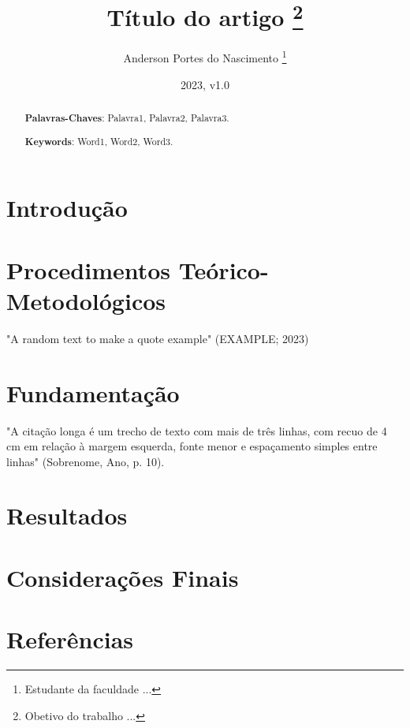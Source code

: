 \documentclass[12pt,a4paper]{article}
\newenvironment{long-quote}{\begin{quotation}\singlespacing\small\noindent}{\end{quotation}}
\begin{document}
    \frenchspacing

    \title{
        Título do artigo \footnote{Obetivo do trabalho ...}
    }
    \author{
        Anderson Portes do Nascimento \footnote{Estudante da faculdade ...}
    }
    \date{2023, v1.0}
    \maketitle

    \begin{abstract}
        \lipsum[1]

        \bigskip

        \noindent\textbf{Palavras-Chaves}: Palavra1, Palavra2, Palavra3.
    \end{abstract}

    \begin{otherlanguage}{english}
        \begin{abstract}
            \lipsum[1]

            \bigskip

            \noindent\textbf{Keywords}: Word1, Word2, Word3.
        \end{abstract}
    \end{otherlanguage}
    
    \section{Introdução}
        \lipsum[1]

        \lipsum[1]
    \section{Procedimentos Teórico-Metodológicos}
        "A random text to make a quote example" (EXAMPLE; 2023)
    \section{Fundamentação}
        \lipsum[1]
        
        \begin{long-quote}
            "A citação longa é um trecho de texto com mais de três linhas, com recuo de 4 cm em relação à margem esquerda, fonte menor e espaçamento simples entre linhas" (Sobrenome, Ano, p. 10).
        \end{long-quote}

        \lipsum[1]
    \section{Resultados}
        \lipsum[1]
    \section{Considerações Finais}
        \lipsum[1]
    \section{Referências}
\end{document}

